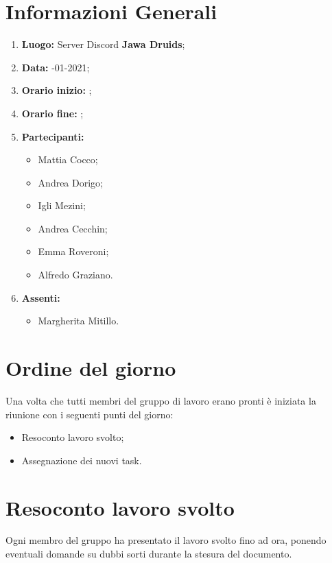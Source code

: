 \newpage
	\section{Informazioni Generali}
	\begin{enumerate}
		\item \textbf{Luogo:} \normalfont Server Discord \textbf{Jawa Druids};
		\item \textbf{Data:} -01-2021;
		\item \textbf{Orario inizio:} ;
		\item \textbf{Orario fine:} ;
		\item \textbf{Partecipanti:}
		\begin{itemize}
			\item Mattia Cocco;
			\item Andrea Dorigo;
			\item Igli Mezini;
			\item Andrea Cecchin;
			\item Emma Roveroni;
			\item Alfredo Graziano.
		\end{itemize}
		\item \textbf{Assenti:}
		\begin{itemize}
			\item Margherita Mitillo.
		\end{itemize}
	\end{enumerate}
	\section{Ordine del giorno}
	Una volta che tutti membri del gruppo di lavoro erano pronti è iniziata la riunione con i seguenti punti del giorno:
	\begin{itemize}
		\item Resoconto lavoro svolto;
		\item Assegnazione dei nuovi task.
	\end{itemize}

	\section{Resoconto lavoro svolto}
	Ogni membro del gruppo ha presentato il lavoro svolto fino ad ora, ponendo eventuali domande su dubbi sorti durante la stesura del documento.

